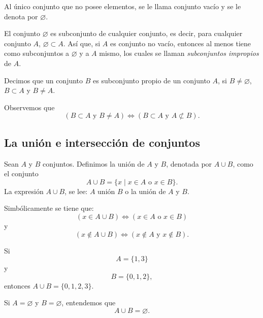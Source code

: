 \newpage

\begin{definicion}{}{}
    Al único conjunto que no posee elementos, se le llama conjunto vacío y se le denota por $\varnothing$.
\end{definicion}

El conjunto $\varnothing$ es subconjunto de cualquier conjunto, es decir, para cualquier conjunto $A$, $\varnothing \subset A$. Así que, si $A$ es conjunto no vacío, entonces al menos tiene como subconjuntos a $\varnothing$ y a $A$ mismo, los cuales se llaman \emph{subconjuntos impropios} de $A$.

\begin{definicion}{}{}
    Decimos que un conjunto $B$ es subconjunto propio de un conjunto $A$, si $B \neq \varnothing$, $B \subset A$ y $B \neq A$.
\end{definicion}

Observemos que
$$(B \subset A \text{ y } B \neq A) \Longleftrightarrow(B \subset A \text{ y } A \not \subset B).$$

\subsection{La unión e intersección de conjuntos}

\begin{definicion}{}{}
    Sean $A$ y $B$ conjuntos. Definimos la unión de $A$ y $B$, denotada por $A \cup B$, como el conjunto
    $$A \cup B = \{x \mid x \in A \text{ o } x \in B\}.$$
    La expresión $A \cup B$, se lee: $A$ unión $B$ o la unión de $A$ y $B$.
\end{definicion}

Simbólicamente se tiene que:
$$(x \in A \cup B) \Longleftrightarrow(x \in A \text{ o } x \in B)$$
y
$$(x \notin A \cup B) \Longleftrightarrow(x \notin A \text{ y } x \notin B).$$
\begin{examplebox}{}{}
    Si
    $$A = \{1,  3\}$$
    y
    $$B = \{0,  1,  2\},$$
    entonces $A \cup B = \{0,  1,  2,  3\}$.
\end{examplebox}

\begin{examplebox}{}{}
    Si $A = \varnothing$ y $B = \varnothing$, entendemos que
    $$A \cup B = \varnothing.$$
\end{examplebox}

